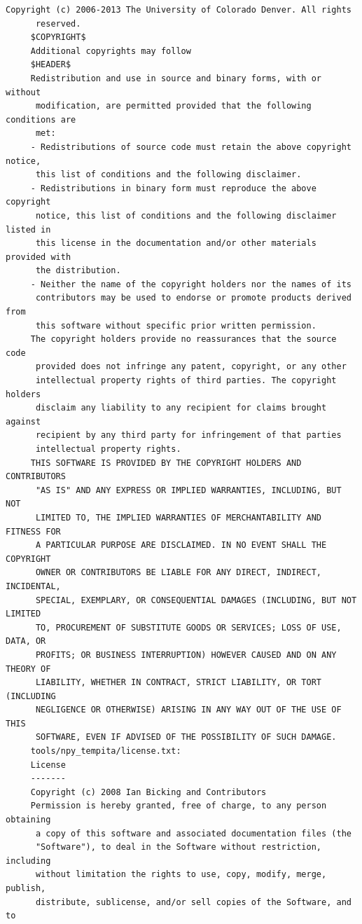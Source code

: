 \begin{lstlisting}[basicstyle=\ttfamily\footnotesize,breaklines=true]
      Copyright (c) 2006-2013 The University of Colorado Denver. All rights
      reserved.
     $COPYRIGHT$
     Additional copyrights may follow
     $HEADER$
     Redistribution and use in source and binary forms, with or without
      modification, are permitted provided that the following conditions are
      met:
     - Redistributions of source code must retain the above copyright notice,
      this list of conditions and the following disclaimer.
     - Redistributions in binary form must reproduce the above copyright
      notice, this list of conditions and the following disclaimer listed in
      this license in the documentation and/or other materials provided with
      the distribution.
     - Neither the name of the copyright holders nor the names of its
      contributors may be used to endorse or promote products derived from
      this software without specific prior written permission.
     The copyright holders provide no reassurances that the source code
      provided does not infringe any patent, copyright, or any other
      intellectual property rights of third parties. The copyright holders
      disclaim any liability to any recipient for claims brought against
      recipient by any third party for infringement of that parties
      intellectual property rights.
     THIS SOFTWARE IS PROVIDED BY THE COPYRIGHT HOLDERS AND CONTRIBUTORS
      "AS IS" AND ANY EXPRESS OR IMPLIED WARRANTIES, INCLUDING, BUT NOT
      LIMITED TO, THE IMPLIED WARRANTIES OF MERCHANTABILITY AND FITNESS FOR
      A PARTICULAR PURPOSE ARE DISCLAIMED. IN NO EVENT SHALL THE COPYRIGHT
      OWNER OR CONTRIBUTORS BE LIABLE FOR ANY DIRECT, INDIRECT, INCIDENTAL,
      SPECIAL, EXEMPLARY, OR CONSEQUENTIAL DAMAGES (INCLUDING, BUT NOT LIMITED
      TO, PROCUREMENT OF SUBSTITUTE GOODS OR SERVICES; LOSS OF USE, DATA, OR
      PROFITS; OR BUSINESS INTERRUPTION) HOWEVER CAUSED AND ON ANY THEORY OF
      LIABILITY, WHETHER IN CONTRACT, STRICT LIABILITY, OR TORT (INCLUDING
      NEGLIGENCE OR OTHERWISE) ARISING IN ANY WAY OUT OF THE USE OF THIS
      SOFTWARE, EVEN IF ADVISED OF THE POSSIBILITY OF SUCH DAMAGE.
     tools/npy_tempita/license.txt:
     License
     -------
     Copyright (c) 2008 Ian Bicking and Contributors
     Permission is hereby granted, free of charge, to any person obtaining
      a copy of this software and associated documentation files (the
      "Software"), to deal in the Software without restriction, including
      without limitation the rights to use, copy, modify, merge, publish,
      distribute, sublicense, and/or sell copies of the Software, and to

\end{lstlisting}

